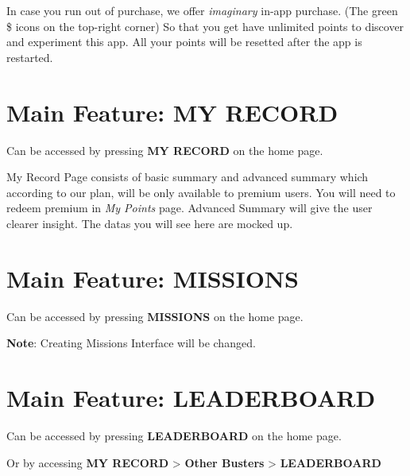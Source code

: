 \documentclass[a4paper,12pt]{article}
\begin{document}
In case you run out of purchase, we offer \textit{imaginary} in-app purchase.
(The green \$ icons on the top-right corner)
So that you get have unlimited points to discover and experiment this app.
All your points will be resetted after the app is restarted.

\pagebreak
\section{Main Feature: MY RECORD}

Can be accessed by pressing \textbf{MY RECORD} on the home page.


My Record Page consists of basic summary and advanced summary which according
to our plan, will be only available to premium users. You will need to redeem 
premium in \textit{My Points} page.
Advanced Summary will give the user clearer insight. 
The datas you will see here are mocked up.

\pagebreak
\section{Main Feature: MISSIONS}

Can be accessed by pressing \textbf{MISSIONS} on the home page.


\textbf{Note}: Creating Missions Interface will be changed.

\pagebreak
\section{Main Feature: LEADERBOARD}

Can be accessed by pressing \textbf{LEADERBOARD} on the home page.

\noindent
Or by accessing \textbf{MY RECORD} > \textbf{Other Busters} > \textbf{LEADERBOARD}

\end{document}
